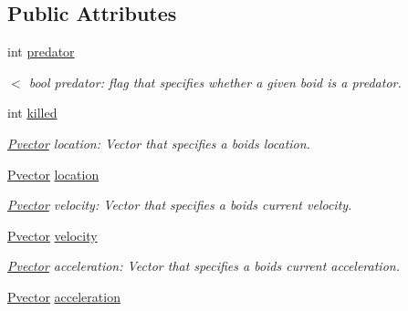 \subsection*{Public Attributes}
\begin{DoxyCompactItemize}
\item 
int \hyperlink{class_boid_af6faa80aeac271c4521eca772336a8b9}{predator}
\begin{DoxyCompactList}\small\item\em $<$ bool predator\+: flag that specifies whether a given boid is a predator. \end{DoxyCompactList}\item 
int \hyperlink{class_boid_afb70f86fbd40056d76c7d3875d20e699}{killed}\hypertarget{class_boid_afb70f86fbd40056d76c7d3875d20e699}{}\label{class_boid_afb70f86fbd40056d76c7d3875d20e699}

\begin{DoxyCompactList}\small\item\em \hyperlink{class_pvector}{Pvector} location\+: Vector that specifies a boid\textquotesingle{}s location. \end{DoxyCompactList}\item 
\hyperlink{class_pvector}{Pvector} \hyperlink{class_boid_a92a7f1ed6423149cd8a28426695d127e}{location}\hypertarget{class_boid_a92a7f1ed6423149cd8a28426695d127e}{}\label{class_boid_a92a7f1ed6423149cd8a28426695d127e}

\begin{DoxyCompactList}\small\item\em \hyperlink{class_pvector}{Pvector} velocity\+: Vector that specifies a boid\textquotesingle{}s current velocity. \end{DoxyCompactList}\item 
\hyperlink{class_pvector}{Pvector} \hyperlink{class_boid_af79ca165b4d1a6ad1db2cbc534095bab}{velocity}\hypertarget{class_boid_af79ca165b4d1a6ad1db2cbc534095bab}{}\label{class_boid_af79ca165b4d1a6ad1db2cbc534095bab}

\begin{DoxyCompactList}\small\item\em \hyperlink{class_pvector}{Pvector} acceleration\+: Vector that specifies a boid\textquotesingle{}s current acceleration. \end{DoxyCompactList}\item 
\hyperlink{class_pvector}{Pvector} \hyperlink{class_boid_ac29a50172433e865b12e1023f00f90c0}{acceleration}\hypertarget{class_boid_ac29a50172433e865b12e1023f00f90c0}{}\label{class_boid_ac29a50172433e865b12e1023f00f90c0}


\end{DoxyCompactItemize}
